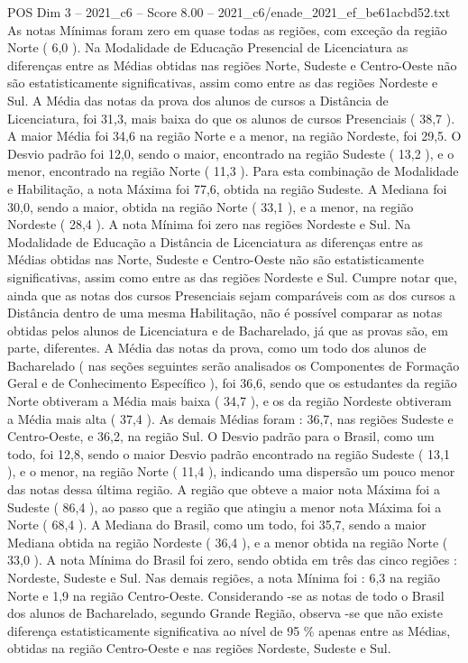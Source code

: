 \begin{textsample}{POS Dim 3 – 2021\_c6 – Score 8.00 – 2021\_c6/enade\_2021\_ef\_be61acbd52.txt}
As notas Mínimas foram zero em quase todas as regiões, com exceção da região Norte ( 6,0 ).
Na Modalidade de Educação Presencial de Licenciatura as diferenças entre as Médias obtidas nas regiões Norte, Sudeste e Centro-Oeste não são estatisticamente significativas, assim como entre as das regiões Nordeste e Sul.
A Média das notas da prova dos alunos de cursos a Distância de Licenciatura, foi 31,3, mais baixa do que os alunos de cursos Presenciais ( 38,7 ).
A maior Média foi 34,6 na região Norte e a menor, na região Nordeste, foi 29,5.
O Desvio padrão foi 12,0, sendo o maior, encontrado na região Sudeste ( 13,2 ), e o menor, encontrado na região Norte ( 11,3 ).
Para esta combinação de Modalidade e Habilitação, a nota Máxima foi 77,6, obtida na região Sudeste.
A Mediana foi 30,0, sendo a maior, obtida na região Norte ( 33,1 ), e a menor, na região Nordeste ( 28,4 ).
A nota Mínima foi zero nas regiões Nordeste e Sul.
Na Modalidade de Educação a Distância de Licenciatura as diferenças entre as Médias obtidas nas Norte, Sudeste e Centro-Oeste não são estatisticamente significativas, assim como entre as das regiões Nordeste e Sul.
Cumpre notar que, ainda que as notas dos cursos Presenciais sejam comparáveis com as dos cursos a Distância dentro de uma mesma Habilitação, não é possível comparar as notas obtidas pelos alunos de Licenciatura e de Bacharelado, já que as provas são, em parte, diferentes.
A Média das notas da prova, como um todo dos alunos de Bacharelado ( nas seções seguintes serão analisados os Componentes de Formação Geral e de Conhecimento Específico ), foi 36,6, sendo que os estudantes da região Norte obtiveram a Média mais baixa ( 34,7 ), e os da região Nordeste obtiveram a Média mais alta ( 37,4 ).
As demais Médias foram : 36,7, nas regiões Sudeste e Centro-Oeste, e 36,2, na região Sul.
O Desvio padrão para o Brasil, como um todo, foi 12,8, sendo o maior Desvio padrão encontrado na região Sudeste ( 13,1 ), e o menor, na região Norte ( 11,4 ), indicando uma dispersão um pouco menor das notas dessa última região.
A região que obteve a maior nota Máxima foi a Sudeste ( 86,4 ), ao passo que a região que atingiu a menor nota Máxima foi a Norte ( 68,4 ).
A Mediana do Brasil, como um todo, foi 35,7, sendo a maior Mediana obtida na região Nordeste ( 36,4 ), e a menor obtida na região Norte ( 33,0 ).
A nota Mínima do Brasil foi zero, sendo obtida em três das cinco regiões : Nordeste, Sudeste e Sul.
Nas demais regiões, a nota Mínima foi : 6,3 na região Norte e 1,9 na região Centro-Oeste.
Considerando -se as notas de todo o Brasil dos alunos de Bacharelado, segundo Grande Região, observa -se que não existe diferença estatisticamente significativa ao nível de 95 \% apenas entre as Médias, obtidas na região Centro-Oeste e nas regiões Nordeste, Sudeste e Sul.

\end{textsample}
